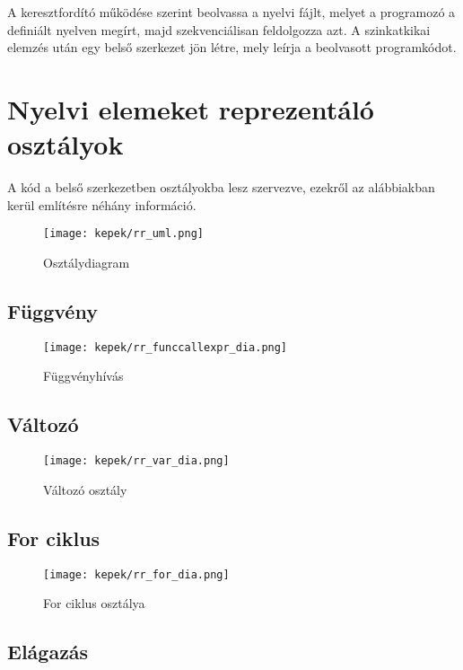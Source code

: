 
A keresztfordító működése szerint beolvassa a nyelvi fájlt, melyet a programozó a definiált nyelven megírt, majd szekvenciálisan feldolgozza azt. A szinkatkikai elemzés után egy belső szerkezet jön létre, mely leírja a beolvasott programkódot.

\section{Nyelvi elemeket reprezentáló osztályok}

A kód a belső szerkezetben osztályokba lesz szervezve, ezekről az alábbiakban kerül említésre néhány információ.

\begin{figure}
\centering
\texttt{[image: kepek/rr\_uml.png]}
\caption{Osztálydiagram}
\label{fig:process}
\end{figure}

\subsection{Függvény}

\begin{figure}
\centering
\texttt{[image: kepek/rr\_funccallexpr\_dia.png]}
\caption{Függvényhívás}
\label{fig:process}
\end{figure}

\subsection{Változó}

\begin{figure}
\centering
\texttt{[image: kepek/rr\_var\_dia.png]}
\caption{Változó osztály}
\label{fig:process}
\end{figure}

\subsection{For ciklus}

\begin{figure}
\centering
\texttt{[image: kepek/rr\_for\_dia.png]}
\caption{For ciklus osztálya}
\label{fig:process}
\end{figure}

\subsection{Elágazás}


